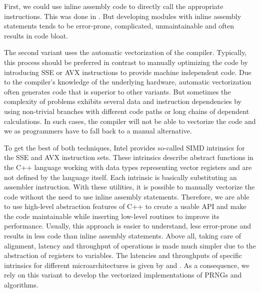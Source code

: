 \documentclass{stdlocal}
\begin{document}
    First, we could use inline assembly code to directly call the appropriate instructions.
    This was done in \textcite{guskova2016,barash2017}.
    But developing modules with inline assembly statements tends to be error-prone, complicated, unmaintainable and often results in code bloat.

    The second variant uses the automatic vectorization of the compiler.
    Typically, this process should be preferred in contrast to manually optimizing the code by introducing SSE or AVX instructions to provide machine independent code.
    Due to the compiler's knowledge of the underlying hardware, automatic vectorization often generates code that is superior to other variants.
    But sometimes the complexity of problems exhibits several data and instruction dependencies by using non-trivial branches with different code paths or long chains of dependent calculations.
    In such cases, the compiler will not be able to vectorize the code and we as programmers have to fall back to a manual alternative.
    \autocite{fog2019a,fog2019b,fog2019c,fog2019d,fog2019e}

    To get the best of both techniques, Intel provides so-called SIMD intrinsics for the SSE and AVX instruction sets.
    These intrinsics describe abstract functions in the C++ language working with data types representing vector registers and are not defined by the language itself.
    Each intrinsic is basically substituting an assembler instruction.
    With these utilities, it is possible to manually vectorize the code without the need to use inline assembly statements.
    Therefore, we are able to use high-level abstraction features of C++ to create a usable API and make the code maintainable while inserting low-level routines to improve its performance.
    Usually, this approach is easier to understand, less error-prone and results in less code than inline assembly statements.
    Above all, taking care of alignment, latency and throughput of operations is made much simpler due to the abstraction of registers to variables.
    The latencies and throughputs of specific intrinsics for different microarchitectures is given by \textcite{intel-intrinsics-guide} and \textcite{fog2019d}.
    As a consequence, we rely on this variant to develop the vectorized implementations of PRNGs and algorithms.
    \autocite{intel-optimization-reference,fog2019a,fog2019b,fog2019c,fog2019d,fog2019e}
\end{document}
